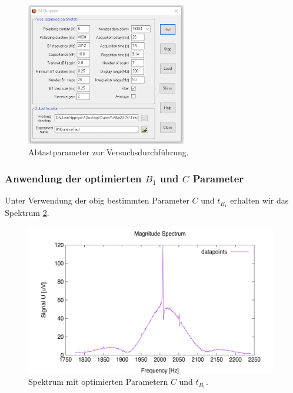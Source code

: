 \documentclass{article}
\begin{document}
            \begin{figure}[H]
                \centering
                \includegraphics[width=7cm]{../Bilddateien/B1Duration_Abtastparameter.png}
                \caption{Abtastparameter zur Versuchsdurchführung.}
                \label{fig:5.2:Abtastparameter}
            \end{figure}

        \subsubsection*{Anwendung der optimierten $B_1$ und $C$ Parameter}
            Unter Verwendung der obig bestimmten Parameter $C$ und $t_{B_1}$ erhalten wir das Spektrum \ref{fig:5:OptiSpectrum}.

            \begin{figure}[H]
                \centering
                \includegraphics[width=11cm]{../Bilddateien/B1_Opti_Spectrum.png}
                \caption{Spektrum mit optimierten Parametern $C$ und $t_{B_1}$.}
                \label{fig:5:OptiSpectrum}
            \end{figure}


    
\end{document}
